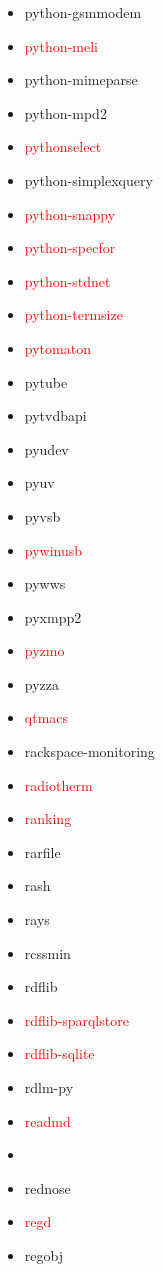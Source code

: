 \documentclass{l4proj}
\begin{document}
\begin{appendices}
{\begin{itemize}
\item python-gsmmodem
\item\textcolor{red}{python-meli}
\item python-mimeparse
\item python-mpd2
\item\textcolor{red}{pythonselect}
\item python-simplexquery
\item\textcolor{red}{python-snappy}
\item\textcolor{red}{python-specfor}
\end{itemize}
}%
\noindent\parbox[t]{0.32\textwidth}{\raggedright%
\begin{itemize}
\item\textcolor{red}{python-stdnet}
\item\textcolor{red}{python-termsize}
\item\textcolor{red}{pytomaton}
\item pytube
\item pytvdbapi
\item pyudev
\item pyuv
\item pyvsb
\item\textcolor{red}{pywinusb}
\item pywws
\item pyxmpp2
\item\textcolor{red}{pyzmo}
\item pyzza
\item\textcolor{red}{qtmacs}
\item rackspace-monitoring
\item\textcolor{red}{radiotherm}
\item\textcolor{red}{ranking}
\item rarfile
\item rash
\item rays
\item rcssmin
\item rdflib
\item\textcolor{red}{rdflib-sparqlstore}
\item\textcolor{red}{rdflib-sqlite}
\item rdlm-py
\item\textcolor{red}{readmd}
\item\textcolor{red}{}
\item rednose
\item\textcolor{red}{regd}
\item regobj
\end{itemize}
}
\end{appendices}
\end{document}
